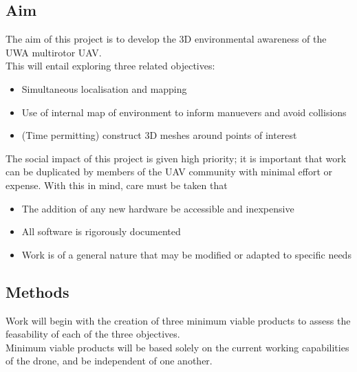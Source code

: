 \documentclass[a4paper, 12pt, titlepage]{article}
\begin{document}
	\subsection{Aim}
	The aim of this project is to develop the 3D environmental awareness of the UWA multirotor UAV.
	\\This will entail exploring three related objectives:
	\begin{itemize}
  		\item Simultaneous localisation and mapping
  		\item Use of internal map of environment to inform manuevers and avoid collisions
  		\item (Time permitting) construct 3D meshes around points of interest
	\end{itemize}
	The social impact of this project is given high priority; it is important that work can be duplicated by members of the UAV community with minimal effort or expense. With this in mind, care must be taken that \begin{itemize}
  		\item The addition of any new hardware be accessible and inexpensive
  		\item All software is rigorously documented
  		\item Work is of a general nature that may be modified or adapted to specific needs
	\end{itemize}
	
	\subsection{Methods}
	Work will begin with the creation of three minimum viable products to assess the feasability of each of the three objectives.
	\\Minimum viable products will be based solely on the current working capabilities of the drone, and be independent of one another.
	
\end{document}
